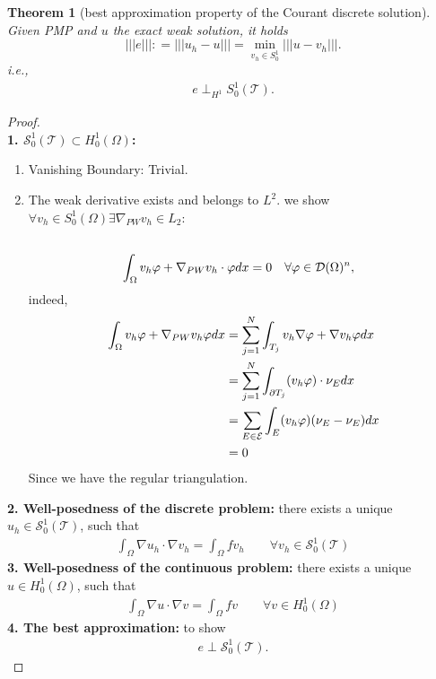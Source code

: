 \documentclass[a4paper,12pt,oneside,fleqn]{book}
\newtheorem{theorem}{Theorem}[section]
\theoremstyle{definition}
\theoremstyle{remark}
\let\div\relax
\DeclareMathOperator{\div}{div}
\begin{document}
\begin{theorem}[best approximation property of the Courant discrete solution]
	 Given PMP and $u$ the exact weak solution, it holds 
	\begin{equation}
		|||e|||: = |||u_h - u ||| = \min_{v_h \in S_0^1}|||u - v_h|||.
	\end{equation}
	i.e.,
	\begin{align*}
		e \perp_{H^1}  S_0^1(\mathcal{T}). 
	\end{align*}
\end{theorem}
\begin{proof}
\quad\\
\textbf{1. $\mathcal{S}_0^1(\mathcal{T}) \subset H_0^1(\Omega)$:} 
\begin{enumerate}
	\item Vanishing Boundary: Trivial.
	\item The weak derivative exists and belongs to $L^2$. we show $\forall v_h \in S_0^1(\Omega) \exists \nabla_{PW} v_h \in L_2:$
	\begin{equation}
	\begin{aligned}
	 \\
	&\int_\Omega v_h \div \varphi + \nabla_{PW} v_h \cdot  \varphi dx = 0 \quad \forall \varphi \in \mathcal{D}(\Omega)^n ,
	\end{aligned}
	\end{equation}
	indeed, 
	\begin{align*}
		\int_\Omega v_h \div \varphi + \nabla_{PW} v_h \varphi dx 
		&= \sum_{j = 1}^N \int_{T_j} v_h\nabla \varphi + \nabla v_h \varphi dx\\
		&=  \sum_{j = 1}^N \int_{\partial T_j} (v_h \varphi) \cdot \nu_E dx\\
		&= \sum_{E \in \mathcal{E}} \int_E (v_h \varphi)(\nu_E - \nu_E) dx \\
		&= 0
	\end{align*}
	Since we have the regular triangulation. 
\end{enumerate} 
\textbf{2. Well-posedness of the discrete problem:}
there exists a unique $u_h \in \mathcal{S}_0^1(\mathcal{T})$, such that
\begin{align*}
	\int_\Omega \nabla u_h \cdot \nabla v_h = \int_\Omega f v_h \qquad \forall v_h \in \mathcal{S}_0^1(\mathcal{T})
\end{align*}
\textbf{3. Well-posedness of the continuous problem:} there exists a unique $u \in H_0^1(\Omega)$, such that
\begin{align*}
	\int_\Omega \nabla u \cdot \nabla v = \int_\Omega f v \qquad \forall v \in H_0^1(\Omega)
\end{align*}
\textbf{4. The best approximation:} to show
\begin{align*}
	e   \perp \mathcal{S}_0^1(\mathcal{T}). 
\end{align*}
\end{proof}
\end{document}
